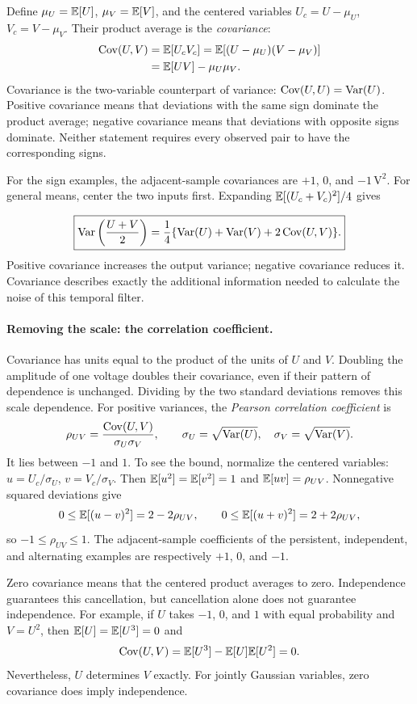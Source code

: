 Define $\mu_U=\mathbb E[U]$, $\mu_V=\mathbb E[V]$, and the centered variables $U_c=U-\mu_U$, $V_c=V-\mu_V$. Their product average is the \emph{covariance}:
\begin{align}
\operatorname{Cov}(U,V)&=\mathbb E[U_cV_c]
=\mathbb E[(U-\mu_U)(V-\mu_V)]\\
&=\mathbb E[UV]-\mu_U\mu_V.
\end{align}
Covariance is the two-variable counterpart of variance: $\operatorname{Cov}(U,U)=\operatorname{Var}(U)$. Positive covariance means that deviations with the same sign dominate the product average; negative covariance means that deviations with opposite signs dominate. Neither statement requires every observed pair to have the corresponding signs.

For the sign examples, the adjacent-sample covariances are $+1$, $0$, and $-1\,\mathrm{V}^2$. For general means, center the two inputs first. Expanding $\mathbb E[(U_c+V_c)^2]/4$ gives

\[
\boxed{\operatorname{Var}\left(\frac{U+V}{2}\right)
=\frac14\{\operatorname{Var}(U)+\operatorname{Var}(V)+2\operatorname{Cov}(U,V)\}.}
\]
Positive covariance increases the output variance; negative covariance reduces it. Covariance describes exactly the additional information needed to calculate the noise of this temporal filter.

\paragraph{Removing the scale: the correlation coefficient.}
Covariance has units equal to the product of the units of $U$ and $V$. Doubling the amplitude of one voltage doubles their covariance, even if their pattern of dependence is unchanged. Dividing by the two standard deviations removes this scale dependence. For positive variances, the \emph{Pearson correlation coefficient} is
\[
\rho_{UV}=\frac{\operatorname{Cov}(U,V)}{\sigma_U\sigma_V},
\qquad \sigma_U=\sqrt{\operatorname{Var}(U)},\quad \sigma_V=\sqrt{\operatorname{Var}(V)}.
\]
It lies between $-1$ and $1$. To see the bound, normalize the centered variables: $u=U_c/\sigma_U$, $v=V_c/\sigma_V$. Then $\mathbb E[u^2]=\mathbb E[v^2]=1$ and $\mathbb E[uv]=\rho_{UV}$. Nonnegative squared deviations give
\[
0\leq\mathbb E[(u-v)^2]=2-2\rho_{UV},\qquad
0\leq\mathbb E[(u+v)^2]=2+2\rho_{UV},
\]
so $-1\leq\rho_{UV}\leq1$. The adjacent-sample coefficients of the persistent, independent, and alternating examples are respectively $+1$, $0$, and $-1$.

Zero covariance means that the centered product averages to zero. Independence guarantees this cancellation, but cancellation alone does not guarantee independence. For example, if $U$ takes $-1$, $0$, and $1$ with equal probability and $V=U^2$, then $\mathbb E[U]=\mathbb E[U^3]=0$ and
\[
\operatorname{Cov}(U,V)=\mathbb E[U^3]-\mathbb E[U]\mathbb E[U^2]=0.
\]
Nevertheless, $U$ determines $V$ exactly. For jointly Gaussian variables, zero covariance does imply independence.

